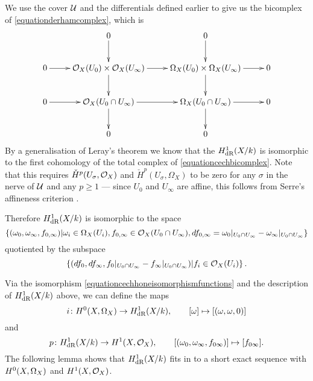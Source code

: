 We use the cover $\cal U$ and the \cech differentials defined earlier to give us the \cech bicomplex of \eqref{equationderhamcomplex}, which is
    \begin{equation}\label{equationcechbicomplex}
    \xymatrix{ & 0 \ar[d] & 0 \ar[d] & \\
    0 \ar[r] & \cO_X(U_0) \times \cO_X(U_\infty) \ar[d] \ar[r] & \Omega_X(U_0) \times \Omega_X(U_\infty) \ar[d] \ar[r] & 0 \\
    0 \ar[r] & \cO_X(U_0\cap U_\infty) \ar[d] \ar[r] & \Omega_X(U_0 \cap U_\infty) \ar[r] \ar[d] & 0 \\
    & 0 & 0 &}
    \end{equation}
By a generalisation of Leray's theorem \cite[Cor.\ 12.4.7]{EGA0III} we know that the $H_{\text {dR}}^1(X/k)$ is isomorphic to the first cohomology of the total complex of \eqref{equationcechbicomplex}.
Note that this requires ${\check H}^p(U_\sigma, {\cal O}_X)$ and ${\check H}^p(U_\sigma, \Omega_X)$ to be zero for any $\sigma$ in the nerve of ${\mathcal U}$ and any $p \geq 1$ ---
since $U_0$ and $U_\infty$ are affine, this follows from Serre's affineness criterion \cite[Thm.\ 5.2.23]{liu}.


Therefore $H_{\text {dR}}^1(X/k)$ is isomorphic to the space
    \begin{equation}\label{equationderhamspace}
    \left\{(\omega_0, \omega_\infty, f_{0,\infty}) | \omega_i\in \Omega_X(U_i), f_{0,\infty}\in {\cal O}_X(U_0 \cap U_\infty), df_{0,\infty} = \omega_0|_{U_0\cap U_\infty} - \omega_\infty|_{U_0\cap U_\infty} \right\}
    \end{equation}
quotiented by the subspace
    \begin{equation}\label{equationderhamquotient}
    \left\{  (df_0, df_\infty, f_0|_{U_0\cap U_\infty} -f_\infty|_{U_0\cap U_\infty} )|f_i \in {\cal O}_X(U_i)\right\}.
    \end{equation}

Via the isomorphism \eqref{equationcechhoneisomorphismfunctions} and the description of $H_{\text {dR}}^1(X/k)$ above, we can define the maps
    \begin{equation}\label{equationinjectionofhzerointoderham} 
    i \colon {H^0(X,\Omega_X)} \rightarrow H_{\text {dR}}^1(X/k), \qquad [\omega] \mapsto [(\omega, \omega, 0)]
    \end{equation}
and 
    \begin{equation}\label{equationsurjectionofderhamontohone}
    p \colon H_{\text {dR}}^1(X/k) \rightarrow H^1(X,\mathcal{O}_X), \qquad [(\omega_0, \omega_\infty, f_{0 \infty})] \mapsto [f_{0 \infty}].
    \end{equation}
The following lemma shows that $H_{\text {dR}}^1(X/k)$ fits in to a short exact sequence with ${H^0(X,\Omega_X)}$ and $H^1(X,\mathcal{O}_X)$.
    
